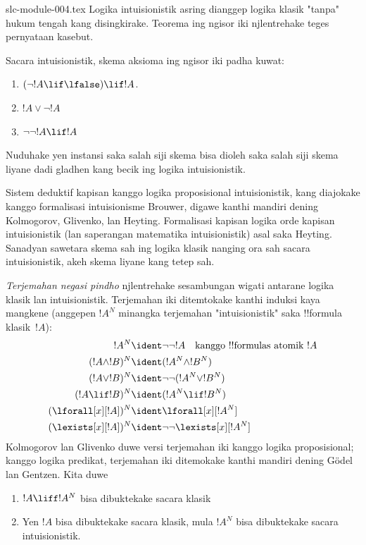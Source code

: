 \begin{filecontents*}[overwrite]{slc-module-004.tex}
Logika intuisionistik asring
dianggep logika klasik
"tanpa" hukum tengah
kang disingkirake.
Teorema ing ngisor iki
njlentrehake teges
pernyataan kasebut.
\begin{thm}
Sacara intuisionistik,
skema aksioma ing ngisor
iki padha kuwat:
\begin{enumerate}
\item $(\lnot !A \lif \lfalse) \lif !A$.
\item $!A \lor \lnot !A$
\item $\lnot \lnot !A \lif !A$
\end{enumerate}
\end{thm}
Nuduhake yen instansi saka
salah siji skema bisa dioleh
saka salah siji skema liyane
dadi gladhen kang becik
ing logika intuisionistik.

Sistem deduktif kapisan
kanggo logika proposisional
intuisionistik, kang diajokake
kanggo formalisasi intuisionisme
Brouwer, digawe kanthi mandiri
dening Kolmogorov, Glivenko,
lan Heyting. Formalisasi
kapisan logika orde kapisan
intuisionistik (lan saperangan
matematika intuisionistik)
asal saka Heyting. Sanadyan
sawetara skema sah ing logika
klasik nanging ora sah sacara
intuisionistik, akeh skema
liyane kang tetep sah.

\emph{Terjemahan negasi pindho}
njlentrehake sesambungan
wigati antarane logika klasik
lan intuisionistik.
Terjemahan iki ditemtokake
kanthi induksi kaya mangkene
(anggepen $!A^N$ minangka
terjemahan "intuisionistik"
saka !!{formula} klasik~$!A$):
\begin{align*}
!A^N & \ident \lnot\lnot !A \quad \text{kanggo !!{formula}s atomik $!A$} \\
(!A \land !B)^N & \ident (!A^N \land !B^N) \\
(!A \lor !B)^N & \ident  \lnot\lnot (!A^N \lor !B^N) \\
(!A \lif !B)^N & \ident (!A^N \lif !B^N) \\
(\lforall[x][!A])^N & \ident \lforall[x][!A^N] \\
(\lexists[x][!A])^N & \ident \lnot\lnot\lexists[x][!A^N]
\end{align*}
Kolmogorov lan Glivenko
duwe versi terjemahan iki
kanggo logika proposisional;
kanggo logika predikat,
terjemahan iki ditemokake
kanthi mandiri dening
G\"odel lan Gentzen.
Kita duwe

\begin{thm}
\begin{enumerate}
\item $!A \liff !A^N$ bisa dibuktekake sacara klasik
\item Yen $!A$ bisa dibuktekake sacara klasik,
  mula $!A^N$ bisa dibuktekake sacara intuisionistik.
\end{enumerate}
\end{thm}


\end{filecontents*}
